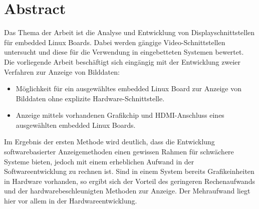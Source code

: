 \section*{Abstract}
\label{sec:Abstract}
Das Thema der Arbeit ist die Analyse und  Entwicklung von Displayschnittstellen für embedded Linux Boards. Dabei werden gängige Video-Schnittstellen untersucht und diese für die Verwendung in eingebetteten Systemen bewertet.\\
Die vorliegende Arbeit beschäftigt sich eingängig mit der Entwicklung zweier Verfahren zur Anzeige von Bilddaten:
\begin{itemize}
\item Möglichkeit für ein ausgewähltes embedded Linux Board zur Anzeige von Bilddaten ohne explizite Hardware-Schnittstelle.
\item Anzeige mittels vorhandenen Grafikchip und HDMI-Anschluss eines ausgewählten embedded Linux Boards.
\end{itemize}
Im Ergebnis der ersten Methode wird deutlich, dass die Entwicklung softwarebasierter Anzeigemethoden einen gewissen Rahmen für schwächere Systeme bieten, jedoch mit einem erheblichen Aufwand in der Softwareentwicklung zu rechnen ist. Sind in einem System bereits Grafikeinheiten in Hardware vorhanden, so ergibt sich der Vorteil des geringeren Rechenaufwands und der hardwarebeschleunigten Methoden zur Anzeige. Der Mehraufwand liegt hier vor allem in der Hardwareentwicklung.
